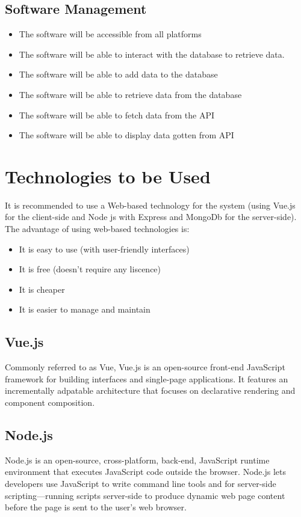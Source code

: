 \documentclass[twoside, a4paper, 12pt]{report}
\begin{document}
\subsection{Software Management}
\begin{itemize}
	\item The software will be accessible from all platforms
	\item The software will be able to interact with the database to retrieve data.
	\item The software will be able to add data to the database
	\item The software will be able to retrieve data from the database
	\item The software will be able to fetch data from the API
	\item The software will be able to display data gotten from API
\end{itemize}

\section{Technologies to be Used}
It is recommended to use a Web-based technology for the system (using Vue.js for the client-side and Node js with Express and MongoDb for the server-side). The advantage of using web-based technologies is:
\begin{itemize}
	\item It is easy to use (with user-friendly interfaces)
	\item It is free (doesn't require any liscence)
	\item It is cheaper
	\item It is easier to manage and maintain
\end{itemize}

\subsection{Vue.js}
Commonly referred to as Vue, Vue.js is an open-source front-end JavaScript framework for building interfaces and single-page applications. It features an incrementally adpatable architecture that focuses on declarative rendering and component composition.

\subsection{Node.js}
Node.js is an open-source, cross-platform, back-end, JavaScript runtime environment that executes JavaScript code outside the browser. Node.js lets developers use JavaScript to write command line tools and for server-side scripting—running scripts server-side to produce dynamic web page content before the page is sent to the user's web browser.
\end{document}

